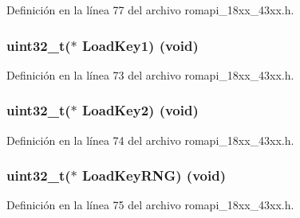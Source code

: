 Definición en la línea 77 del archivo romapi\+\_\+18xx\+\_\+43xx.\+h.

\subsubsection[{\texorpdfstring{Load\+Key1}{LoadKey1}}]{\setlength{\rightskip}{0pt plus 5cm}uint32\+\_\+t($\ast$ Load\+Key1) (void)}\hypertarget{struct_a_e_s___a_p_i___t_a762bb901b2853d0795c07211b730189e}{}\label{struct_a_e_s___a_p_i___t_a762bb901b2853d0795c07211b730189e}


Definición en la línea 73 del archivo romapi\+\_\+18xx\+\_\+43xx.\+h.

\subsubsection[{\texorpdfstring{Load\+Key2}{LoadKey2}}]{\setlength{\rightskip}{0pt plus 5cm}uint32\+\_\+t($\ast$ Load\+Key2) (void)}\hypertarget{struct_a_e_s___a_p_i___t_a62a8f0af84db0dfe17b22906017e9339}{}\label{struct_a_e_s___a_p_i___t_a62a8f0af84db0dfe17b22906017e9339}


Definición en la línea 74 del archivo romapi\+\_\+18xx\+\_\+43xx.\+h.

\subsubsection[{\texorpdfstring{Load\+Key\+R\+NG}{LoadKeyRNG}}]{\setlength{\rightskip}{0pt plus 5cm}uint32\+\_\+t($\ast$ Load\+Key\+R\+NG) (void)}\hypertarget{struct_a_e_s___a_p_i___t_aa5bcdf39145584cc13cda68909d2eb0e}{}\label{struct_a_e_s___a_p_i___t_aa5bcdf39145584cc13cda68909d2eb0e}


Definición en la línea 75 del archivo romapi\+\_\+18xx\+\_\+43xx.\+h.

